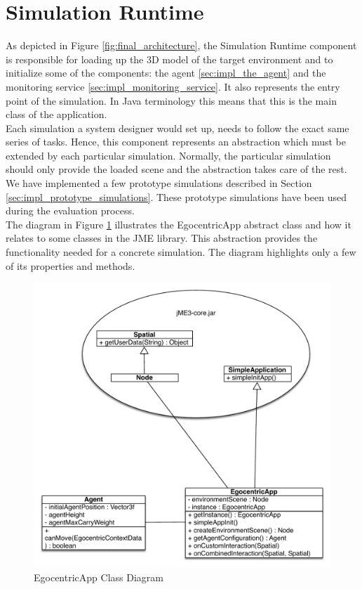 \section{Simulation Runtime} %
\label{sec:impl_simulation_runtime}
As depicted in Figure \ref{fig:final_architecture}, the Simulation Runtime component is responsible for loading up the 3D model of the target environment and to initialize some of the components: the agent \ref{sec:impl_the_agent} and the monitoring service \ref{sec:impl_monitoring_service}. It also represents the entry point of the simulation. In Java terminology this means that this is the main class of the application.\\

Each simulation a system designer would set up, needs to follow the exact same series of tasks. Hence, this component represents an abstraction which must be extended by each particular simulation. Normally, the particular simulation should only provide the loaded scene and the abstraction takes care of the rest. We have implemented a few prototype simulations described in Section \ref{sec:impl_prototype_simulations}. These prototype simulations have been used during the evaluation process.\\

The diagram in Figure \ref{fig:impl_ego_app} illustrates the EgocentricApp abstract class and how it relates to some classes in the JME library. This abstraction provides the functionality needed for a concrete simulation. The diagram highlights only a few of its properties and methods.
\begin{figure}[H]
	\centering
	\includegraphics[width=\linewidth]{gfx/Chapter4/ego_app}
	\caption{EgocentricApp Class Diagram}
	\label{fig:impl_ego_app}
\end{figure}

